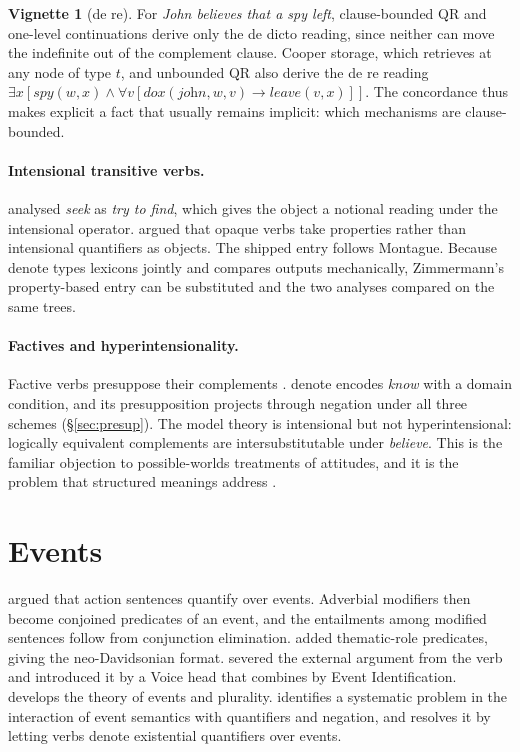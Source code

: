 \documentclass[11pt,a4paper]{article}
\newcommand{\dn}{\textsf{denote}}
\theoremstyle{definition}
\newtheorem{vignette}{Vignette}
\begin{document}
\begin{vignette}[de re]\label{v:dere}
For \textit{John believes that a spy left}, clause-bounded QR and one-level continuations derive only the de dicto reading, since neither can move the indefinite out of the complement clause. Cooper storage, which retrieves at any node of type $t$, and unbounded QR also derive the de re reading $\exists x[\textit{spy}(w,x)\wedge\forall v[\textit{dox}(\textit{john},w,v)\to\textit{leave}(v,x)]]$. The concordance thus makes explicit a fact that usually remains implicit: which mechanisms are clause-bounded.
\end{vignette}

\paragraph{Intensional transitive verbs.} \citet{montague1973} analysed \textit{seek} as \textit{try to find}, which gives the object a notional reading under the intensional operator. \citet{zimmermann1993} argued that opaque verbs take properties rather than intensional quantifiers as objects. The shipped entry follows Montague. Because \dn{} types lexicons jointly and compares outputs mechanically, Zimmermann's property-based entry can be substituted and the two analyses compared on the same trees.

\paragraph{Factives and hyperintensionality.} Factive verbs presuppose their complements \citep{kiparsky1970}. \dn{} encodes \textit{know} with a domain condition, and its presupposition projects through negation under all three schemes (\S\ref{sec:presup}). The model theory is intensional but not hyperintensional: logically equivalent complements are intersubstitutable under \textit{believe}. This is the familiar objection to possible-worlds treatments of attitudes, and it is the problem that structured meanings address \citep{cresswell1985}.

\section{Events}\label{sec:events}

\citet{davidson1967} argued that action sentences quantify over events. Adverbial modifiers then become conjoined predicates of an event, and the entailments among modified sentences follow from conjunction elimination. \citet{parsons1990} added thematic-role predicates, giving the neo-Davidsonian format. \citet{kratzer1996} severed the external argument from the verb and introduced it by a Voice head that combines by Event Identification. \citet{landman2000} develops the theory of events and plurality. \citet{champollion2015} identifies a systematic problem in the interaction of event semantics with quantifiers and negation, and resolves it by letting verbs denote existential quantifiers over events.
\end{document}
